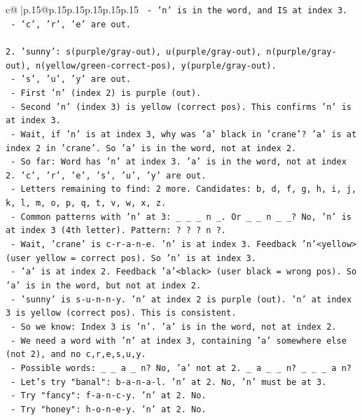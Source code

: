 \documentclass{article}
\begin{document}
{\begin{supertabular}{c@{$\;$}|p{.15\linewidth}@{}p{.15\linewidth}p{.15\linewidth}p{.15\linewidth}p{.15\linewidth}p{.15\linewidth}}
{{{\texttt{   {-} 'n' is in the word, and IS at index 3.} \\
\texttt{   {-} 'c', 'r', 'e' are out.} \\
\\ 
\texttt{2. 'sunny': s(purple/gray{-}out), u(purple/gray{-}out), n(purple/gray{-}out), n(yellow/green{-}correct{-}pos), y(purple/gray{-}out).} \\
\texttt{   {-} 's', 'u', 'y' are out.} \\
\texttt{   {-} First 'n' (index 2) is purple (out).} \\
\texttt{   {-} Second 'n' (index 3) is yellow (correct pos). This confirms 'n' is at index 3.} \\
\texttt{   {-} Wait, if 'n' is at index 3, why was 'a' black in 'crane'? 'a' is at index 2 in 'crane'. So 'a' is in the word, not at index 2.} \\
\texttt{   {-} So far: Word has 'n' at index 3. 'a' is in the word, not at index 2. 'c', 'r', 'e', 's', 'u', 'y' are out.} \\
\texttt{   {-} Letters remaining to find: 2 more. Candidates: b, d, f, g, h, i, j, k, l, m, o, p, q, t, v, w, x, z.} \\
\texttt{   {-} Common patterns with 'n' at 3: \_ \_ \_ n \_. Or \_ \_ n \_ \_? No, 'n' is at index 3 (4th letter). Pattern: ? ? ? n ?.} \\
\texttt{   {-} Wait, 'crane' is c{-}r{-}a{-}n{-}e. 'n' is at index 3. Feedback 'n'<yellow> (user yellow = correct pos). So 'n' is at index 3.} \\
\texttt{   {-} 'a' is at index 2. Feedback 'a'<black> (user black = wrong pos). So 'a' is in the word, but not at index 2.} \\
\texttt{   {-} 'sunny' is s{-}u{-}n{-}n{-}y. 'n' at index 2 is purple (out). 'n' at index 3 is yellow (correct pos). This is consistent.} \\
\texttt{   {-} So we know: Index 3 is 'n'. 'a' is in the word, not at index 2.} \\
\texttt{   {-} We need a word with 'n' at index 3, containing 'a' somewhere else (not 2), and no c,r,e,s,u,y.} \\
\texttt{   {-} Possible words: \_ \_ a \_ n? No, 'a' not at 2. \_ a \_ \_ n? \_ \_ \_ a n?} \\
\texttt{   {-} Let's try "banal": b{-}a{-}n{-}a{-}l. 'n' at 2. No, 'n' must be at 3.} \\
\texttt{   {-} Try "fancy": f{-}a{-}n{-}c{-}y. 'n' at 2. No.} \\
\texttt{   {-} Try "honey": h{-}o{-}n{-}e{-}y. 'n' at 2. No.} \\
}}}
\end{supertabular}}
\end{document}
